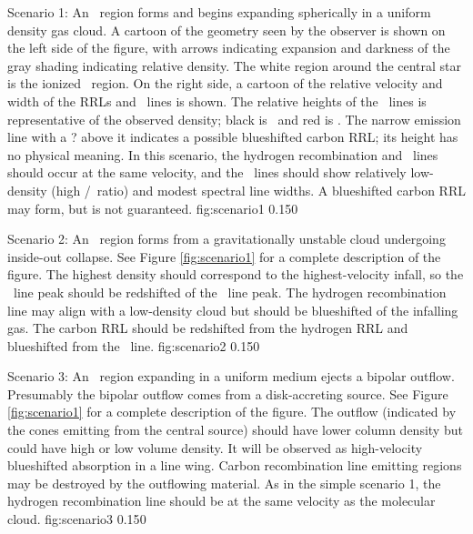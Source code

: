 {Scenario 1: An \uchii\ region forms and begins expanding spherically
in a uniform density gas cloud.  A cartoon of the geometry seen by the observer
is shown on the left side of the figure, with arrows indicating expansion and
darkness of the gray shading indicating relative density.  The white region
around the central star is the ionized \uchii\ region.  On the right side, a
cartoon of the relative velocity and width of the RRLs and \formaldehyde\ lines
is shown.  The relative heights of the \formaldehyde\ lines is representative
of the observed density;  black is \oneone\ and red is \twotwo.  The narrow
emission line with a ? above it indicates a possible blueshifted carbon RRL;
its height has no physical meaning.  In this scenario, the hydrogen
recombination and \formaldehyde\ lines should occur at the same velocity, and
the \formaldehyde\ lines should show relatively low-density (high
\oneone/\twotwo\ ratio) and modest spectral line widths.  A blueshifted carbon
RRL may form, but is not guaranteed.}
{fig:scenario1}
{0.15}{0}

{Scenario 2: An \uchii\ region forms from a gravitationally unstable cloud
undergoing inside-out collapse.  See Figure \ref{fig:scenario1} for a complete
description of the figure.  The highest density should correspond to the
highest-velocity infall, so the \twotwo\ line peak should be redshifted of the
\oneone\ line peak.  The hydrogen recombination line may align with a
low-density cloud but should be blueshifted of the infalling gas.  The carbon
RRL should be redshifted from the hydrogen RRL and blueshifted from the
\formaldehyde\ line.}
{fig:scenario2}
{0.15}{0}

{Scenario 3: An \uchii\ region expanding in a uniform medium ejects a bipolar
outflow.  Presumably the bipolar outflow comes from a disk-accreting source.
See Figure \ref{fig:scenario1} for a complete
description of the figure.
The outflow (indicated by the cones emitting from the central source) should
have lower column density but could have high or low volume density.  It will be 
observed as high-velocity blueshifted absorption in a line wing.  Carbon
recombination line emitting regions may be destroyed by the outflowing
material.  As in the simple scenario 1, the hydrogen recombination line should
be at the same velocity as the molecular cloud.}
{fig:scenario3}
{0.15}{0}

